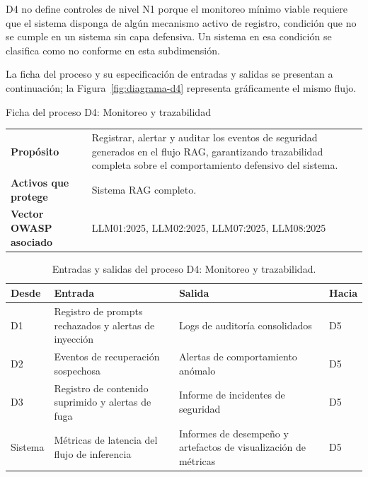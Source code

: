 D4 no define controles de nivel N1 porque el monitoreo mínimo viable requiere que el sistema disponga de algún mecanismo activo de registro, condición que no se cumple en un sistema sin capa defensiva. Un sistema en esa condición se clasifica como no conforme en esta subdimensión.

La ficha del proceso y su especificación de entradas y salidas se presentan a continuación; la Figura~\ref{fig:diagrama-d4} representa gráficamente el mismo flujo.

\begin{fichabox}{Ficha del proceso D4: Monitoreo y trazabilidad}
  \begin{tabularx}{\textwidth}{@{} l X @{}}
    \textbf{Propósito} &
      Registrar, alertar y auditar los eventos de seguridad generados en el flujo RAG, garantizando trazabilidad completa sobre el comportamiento defensivo del sistema. \\[4pt]
    \textbf{Activos que protege} &
      Sistema RAG completo. \\[4pt]
    \textbf{Vector OWASP asociado} &
      LLM01:2025, LLM02:2025, LLM07:2025, LLM08:2025 \\
  \end{tabularx}
\end{fichabox}

\begin{table}[H]
  \centering
  \caption{Entradas y salidas del proceso D4: Monitoreo y trazabilidad.}
  \label{tab:es-d4}
  \begin{tabularx}{\textwidth}{@{} l >{\hsize=1.20\hsize\raggedright\arraybackslash}X >{\hsize=0.80\hsize\raggedright\arraybackslash}X l @{}}
    \toprule
    \textbf{Desde} & \textbf{Entrada} & \textbf{Salida} & \textbf{Hacia} \\
    \midrule
    D1 &
      Registro de prompts rechazados y alertas de inyección &
      Logs de auditoría consolidados &
      D5 \\
    D2 &
      Eventos de recuperación sospechosa &
      Alertas de comportamiento anómalo &
      D5 \\
    D3 &
      Registro de contenido suprimido y alertas de fuga &
      Informe de incidentes de seguridad &
      D5 \\
    Sistema &
      Métricas de latencia del flujo de inferencia &
      Informes de desempeño y artefactos de visualización de métricas &
      D5 \\
    \bottomrule
  \end{tabularx}
\end{table}

